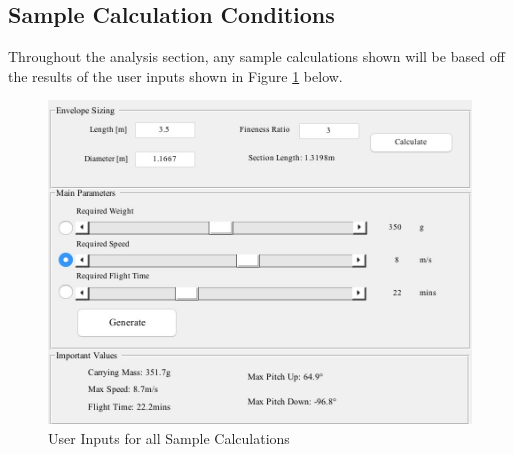 \documentclass[../main.tex]{subfiles}
\begin{document}
	
\subsection{Sample Calculation Conditions} \label{sampleCalcs}
Throughout the analysis section, any sample calculations shown will be based off the results of the user inputs shown in Figure \ref{fig:sampleCalcs} below.


	\begin{figure}[H]
		\centering
		\includegraphics[width=.7\linewidth]{img/gui/sampleCalculationInputs.JPG}
		\caption{User Inputs for all Sample Calculations}
		\label{fig:sampleCalcs}
	\end{figure}
\end{document}

